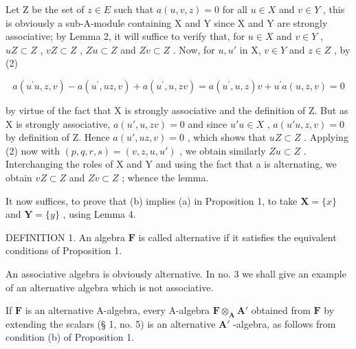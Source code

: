 Let Z be the set of \(z \in E\) such that \(a(u, v, z) = 0\) for all \(u \in X\) and \(v \in Y\) , this is obviously a sub-A-module containing X and Y since X and Y are strongly associative; by Lemma 2, it will suffice to verify that, for \(u \in X\) and \(v \in Y\) , \(uZ \subset Z\) , \(vZ \subset Z\) , \(Zu \subset Z\) and \(Zv \subset Z\) . Now, for \(u, u'\) in X, \(v \in Y\) and \(z \in Z\) , by (2)

\[
a (u ^ {\prime} u, z, v) - a (u ^ {\prime}, u z, v) + a (u ^ {\prime}, u, z v) = a (u ^ {\prime}, u, z) v + u ^ {\prime} a (u, z, v) = 0
\]

by virtue of the fact that X is strongly associative and the definition of Z. But as X is strongly associative, \(a(u', u, zv) = 0\) and since \(u'u \in X\) , \(a(u'u, z, v) = 0\) by definition of Z. Hence \(a(u', uz, v) = 0\) , which shows that \(uZ \subset Z\) . Applying (2) now with \((p, q, r, s) = (v, z, u, u')\) , we obtain similarly \(Zu \subset Z\) . Interchanging the roles of X and Y and using the fact that a is alternating, we obtain \(vZ \subset Z\) and \(Zv \subset Z\) ; whence the lemma.

It now suffices, to prove that (b) implies (a) in Proposition 1, to take \(\mathbf{X} = \{x\}\) and \(\mathbf{Y} = \{y\}\) , using Lemma 4.

DEFINITION 1. An algebra \(\mathbf{F}\) is called alternative if it satisfies the equivalent conditions of Proposition 1.

An associative algebra is obviously alternative. In no. 3 we shall give an example of an alternative algebra which is not associative.

If \(\mathbf{F}\) is an alternative A-algebra, every A-algebra \(\mathbf{F} \otimes_{\mathbf{A}} \mathbf{A}'\) obtained from \(\mathbf{F}\) by extending the scalars (§ 1, no. 5) is an alternative \(\mathbf{A}'\) -algebra, as follows from condition (b) of Proposition 1.

